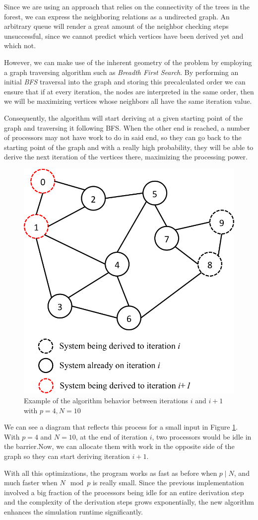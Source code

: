 \documentclass[letterpaper,twoside,11pt]{article}
\begin{document}
\begin{multicols}{2}
Since we are using an approach that relies on the connectivity of the trees in the forest, we can express the neighboring relations as a undirected graph. An arbitrary queue will render a great amount of the neighbor checking steps unsuccessful, since we cannot predict which vertices have been derived yet and which not.

However, we can make use of the inherent geometry of the problem by employing a graph traversing algorithm such as \emph{Breadth First Search}. By performing an initial \emph{BFS} traversal into the graph and storing this precalculated order we can ensure that if at every iteration, the nodes are interpreted in the same order, then we will be maximizing vertices whose neighbors all have the same iteration value.

Consequently, the algorithm will start deriving at a given starting point of the graph and traversing it following BFS. When the other end is reached, a number of processors may not have work to do in said end, so they can go back to the starting point of the graph and  with a really high probability, they will be able to derive the next iteration of the vertices there, maximizing the processing power.
\begin{figure}[H]
  \centering
    \includegraphics[width=.4\textwidth]{grafo.png}
    \caption{Example of the algorithm behavior between iterations $i$ and $i+1$ with $p = 4, N = 10$}
    \label{fig:graph}
\end{figure}
We can see a diagram that reflects this process for a small input in Figure \ref{fig:graph}. With $p = 4$ and $N = 10$, at the end of iteration $i$, two processors would be idle in the barrier.Now, we can allocate them with work in the opposite side of the graph so they can start deriving iteration $i+1$.


\vfill
\columnbreak
With all this optimizations, the program works as fast as before when $p \mid N$, and much faster when $N \mod p$ is really small. Since the previous implementation involved a big fraction of the processors being idle for an entire derivation step and the complexity of the derivation steps grows exponentially, the new algorithm enhances the simulation runtime significantly.



\end{multicols}
\end{document}
